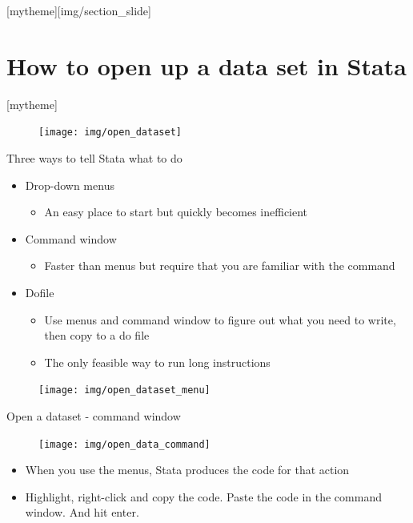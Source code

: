 \documentclass[aspectratio=169]{beamer}
\newcommand{\sectionpic}[2]{
	\setbeamertemplate{section page}[mytheme][#2]
	\section{#1}
	\setbeamertemplate{section page}[mytheme]
}
\begin{document}
\sectionpic{How to open up a data set in Stata}{img/section_slide}

\begin{frame}{}
	\begin{figure}
	\centering
	\texttt{[image: img/open\_dataset]}
\end{figure}
\end{frame}

\begin{frame}{Three ways to tell Stata what to do}
\begin{itemize}
	\item Drop-down menus
		\begin{itemize}
			\item An easy place to start but quickly becomes inefficient
		\end{itemize}
	\item Command window
		\begin{itemize}
			\item Faster than menus but require that you are familiar with the command
		\end{itemize}
	\item Do\-file
		\begin{itemize}
			\item Use menus and command window to figure out what you need to write, then copy to a do file
			\item The only feasible way to run long instructions
		\end{itemize}
\end{itemize}
\end{frame}

\begin{frame}{}
\begin{figure}
	\centering
	\texttt{[image: img/open\_dataset\_menu]}
\end{figure}
\end{frame}

\begin{frame}[fragile]{Open a dataset - command window}
	\begin{figure}
		\centering
		\texttt{[image: img/open\_data\_command]}
	\end{figure}
\begin{itemize}
	\item When you use the menus, Stata produces the code for that action
	\item Highlight, right-click and copy the code. Paste the code in the command window. And hit enter.
\end{itemize}
\end{frame}
\end{document}
